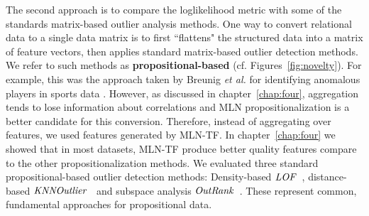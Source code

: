 								The second approach is to compare the loglikelihood metric with some of the standards matrix-based outlier analysis methods. One way to convert relational data to a single data matrix is to first ``flattens" the structured data into a matrix of feature vectors, then applies standard matrix-based outlier detection methods. We refer to such methods as \textbf{propositional-based}
								(cf. Figures~\ref{fig:novelty}). For example, this was the approach taken by Breunig {\em et al.} for identifying anomalous players in sports data \cite{Breunig2000}.
								However, as discussed in chapter~\ref{chap:four}, aggregation 
								tends to lose information about correlations and MLN propositionalization is a better candidate for this conversion. Therefore, instead of aggregating over features, we used features generated by MLN-TF. In chapter~\ref{chap:four} we showed that in most datasets, MLN-TF produce better quality features compare to the other propositionalization methods.
								We evaluated three standard propositional-based outlier detection methods: Density-based $\it{LOF}$~\cite{Breunig2000}, distance-based $\it{KNNOutlier}$~\cite{Ramaswamy2000} and subspace analysis $\it{OutRank}$~\cite{Muller2012}.
								These represent common, fundamental  approaches for propositional data. 
%								
								
